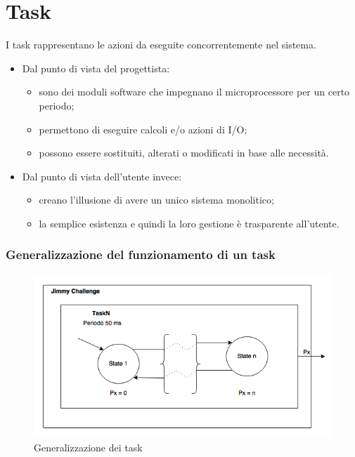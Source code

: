 \chapter{Task}

I task rappresentano le azioni da eseguite concorrentemente nel sistema. 

\begin{itemize}
	\item Dal punto di vista del progettista:
	\begin{itemize}
		\item sono dei moduli software che impegnano il microprocessore per un certo periodo;
		\item permettono di eseguire calcoli e/o azioni di I/O;
		\item possono essere sostituiti, alterati o modificati in base alle necessità.
	\end{itemize}
	\item Dal punto di vista dell'utente invece:
	\begin{itemize}
		\item  creano l'illusione di avere un unico sistema monolitico;
		\item  la semplice esistenza e quindi la loro gestione è trasparente all'utente.
	\end{itemize}
\end{itemize}

\newpage
\subsection{Generalizzazione del funzionamento di un task}
\begin{figure}[!ht]
	\centering
	\includegraphics[scale=.60]{img/task_generic.png}
	\caption{Generalizzazione dei task}
\end{figure}

